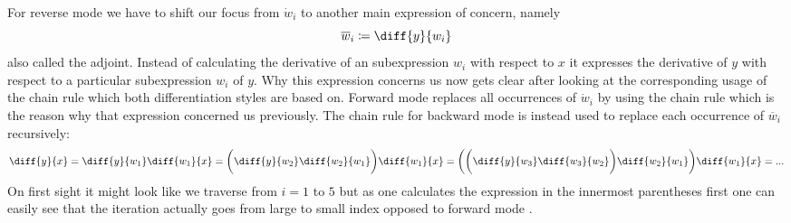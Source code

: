 \newcommand{\overw}[1]{\overline{w}_{#1}}
\newcommand{\diffyw}[1]{\diff{y}{w_{#1}}}
For reverse mode we have to shift our focus from $\dot w_i$ to another main expression of concern, namely
\[ \overw{i} \coloneqq \diffyw{i} \]
also called the adjoint. Instead of calculating the derivative of an subexpression $w_i$ with respect to $x$ it expresses the derivative of $y$ with respect to a particular subexpression $w_i$ of $y$. Why this expression concerns us now gets clear after looking at the corresponding usage of the chain rule  which both differentiation styles are based on. Forward mode replaces all occurrences of $\dot w_i$ by using the chain rule which is the reason why that expression concerned us previously. The chain rule for backward mode is instead used to replace each occurrence of $\overw{i}$ recursively:
\newcommand{\diffw}[2]{\diff{w_{#1}}{w_{#2}}}
\[ \diff{y}{x} = \diffyw{1}\diff{w_1}{x} = \bigg(\diffyw{2}\diffw{2}{1}\bigg)\diff{w_1}{x} = \bigg(\bigg(\diffyw{3}\diffw{3}{2}\bigg)\diffw{2}{1}\bigg)\diff{w_1}{x} = ... \]
On first sight it might look like we traverse from $i = 1$ to $5$ but as one calculates the expression in the innermost parentheses first one can easily see that the iteration actually goes from large to small index opposed to forward mode \todogrammar.

